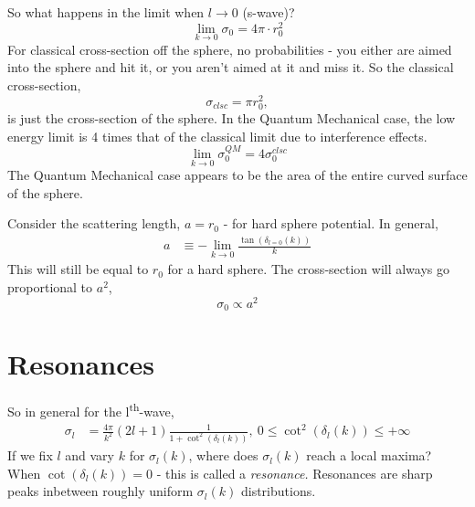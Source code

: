 \documentclass[a4paper, 11pt, normalem]{report}
\begin{document}
So what happens in the limit when $l\to0$ (s-wave)?
\begin{equation}
    \lim_{k\to 0} \sigma_0 = 4\pi\cdot r_0^2
\end{equation}
For classical cross-section off the sphere, no probabilities - you either are aimed into the sphere and hit it, or you aren't aimed at it and miss it. 
So the classical cross-section, 
\begin{equation}
    \sigma_{clsc} = \pi r_0^2,
\end{equation}
is just the cross-section of the sphere.
In the Quantum Mechanical case, the low energy limit is 4 times that of the classical limit due to interference effects.
\begin{equation}
    \lim_{k\to0} \sigma_0^{QM} = 4\sigma_0^{clsc}
\end{equation}
The Quantum Mechanical case appears to be the area of the entire curved surface of the sphere.

Consider the scattering length, $a = r_0$ - for hard sphere potential. 
In general, 
\begin{align}
    a &\equiv -\lim_{k\to0} \frac{\tan(\delta_{l=0}(k))}{k}
\end{align}
This will still be equal to $r_0$ for a hard sphere.
The cross-section will always go proportional to $a^2$,
\begin{equation}
    \sigma_0 \propto a^2
\end{equation}

\section{Resonances}
So in general for the l\textsuperscript{th}-wave, 
\begin{align}
    \sigma_l &= \frac{4\pi}{k^2}(2l+1)\frac{1}{1+\cot^2(\delta_l(k))}, ~0 \leq \cot^2(\delta_l(k)) \leq +\infty
\end{align}
If we fix $l$ and vary $k$ for $\sigma_l(k)$, where does $\sigma_l(k)$ reach a local maxima?
When $\cot(\delta_l(k)) = 0$ - this is called a \emph{resonance.}
Resonances are sharp peaks inbetween roughly uniform $\sigma_l(k)$ distributions.
\end{document}
